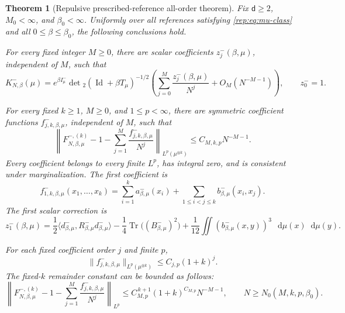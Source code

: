 \documentclass[11pt,reqno]{amsart}
\numberwithin{equation}{section}
\theoremstyle{plain}
\newtheorem{thm}{Theorem}[section]
\theoremstyle{definition}
\renewcommand{\d}{\mathsf d}
\newcommand{\dd}{\mathop{}\!\mathrm d}
\newcommand{\Id}{\operatorname{Id}}
\newcommand{\Tr}{\operatorname{Tr}}
\newcommand{\be}{\beta}
\begin{document}
\begin{thm}[Repulsive prescribed-reference all-order theorem]\label{rep:thm:main}
Fix $\d\ge2$, $M_0<\infty$, and $\be_0<\infty$. Uniformly over all references satisfying \eqref{rep:eq:mu-class} and all $0\le\be\le\be_0$, the following conclusions hold.

For every fixed integer $M\ge0$, there are scalar coefficients $z^-_j(\be,\mu)$, independent of $M$, such that
\begin{equation}\label{rep:eq:partition-all-order}
 K^-_{N,\be}(\mu)
 =e^{\be I^-_\mu}\det{}_2(\Id+\be T_\mu)^{-1/2}
 \left(\sum_{j=0}^{M}\frac{z^-_j(\be,\mu)}{N^j}
 +O_{M}(N^{-M-1})\right),\qquad z^-_0=1.
\end{equation}

For every fixed $k\ge1$, $M\ge0$, and $1\le p<\infty$, there are symmetric coefficient functions $f^-_{j,k,\be,\mu}$, independent of $M$, such that
\begin{equation}\label{rep:eq:marginal-all-order}
 \left\|F_{N,\be,\mu}^{-,(k)}-1-
 \sum_{j=1}^{M}\frac{f^-_{j,k,\be,\mu}}{N^j}
 \right\|_{L^p(\mu^{\otimes k})}
 \le C_{M,k,p}N^{-M-1}.
\end{equation}
Every coefficient belongs to every finite $L^p$, has integral zero, and is consistent under marginalization. The first coefficient is
\begin{equation}\label{rep:eq:first-profile-minus}
 f^-_{1,k,\be,\mu}(x_1,\ldots,x_k)
 =\sum_{i=1}^ka^-_{\be,\mu}(x_i)
 +\sum_{1\le i<j\le k}b^-_{\be,\mu}(x_i,x_j).
\end{equation}
The first scalar correction is
\begin{equation}\label{rep:eq:z1-minus}
 z^-_1(\be,\mu)
 =\frac12\langle d^-_{\be,\mu},R^-_{\be,\mu}d^-_{\be,\mu}\rangle
 -\frac14\Tr\big((B^-_{\be,\mu})^2\big)
 +\frac1{12}\iint (b^-_{\be,\mu}(x,y))^3\,\dd\mu(x)\dd\mu(y).
\end{equation}

For each fixed coefficient order $j$ and finite $p$,
\begin{equation}\label{rep:eq:k-polynomial}
 \|f^-_{j,k,\be,\mu}\|_{L^p(\mu^{\otimes k})}
 \le C_{j,p}(1+k)^j.
\end{equation}
The fixed-$k$ remainder constant can be bounded as follows:
\begin{equation}\label{rep:eq:k-remainder}
 \left\|F_{N,\be,\mu}^{-,(k)}-1-
 \sum_{j=1}^{M}\frac{f^-_{j,k,\be,\mu}}{N^j}
 \right\|_{L^p}
 \le C_{M,p}^{\,k+1}(1+k)^{C_{M,p}}N^{-M-1},
 \qquad N\ge N_0(M,k,p,\be_0).
\end{equation}
\end{thm}
\end{document}
